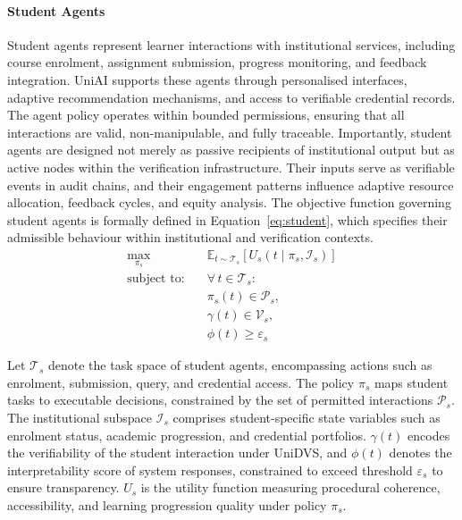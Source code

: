 \documentclass[oneside,10pt]{swissi}
\begin{document}
\paragraph{Student Agents}

Student agents represent learner interactions with institutional services, including course enrolment, assignment submission, progress monitoring, and feedback integration. UniAI supports these agents through personalised interfaces, adaptive recommendation mechanisms, and access to verifiable credential records. The agent policy operates within bounded permissions, ensuring that all interactions are valid, non-manipulable, and fully traceable. Importantly, student agents are designed not merely as passive recipients of institutional output but as active nodes within the verification infrastructure. Their inputs serve as verifiable events in audit chains, and their engagement patterns influence adaptive resource allocation, feedback cycles, and equity analysis. The objective function governing student agents is formally defined in Equation~\ref{eq:student}, which specifies their admissible behaviour within institutional and verification contexts.
\begin{align}
\label{eq:student}
\max_{\pi_s} \quad & \mathbb{E}_{t \sim \mathcal{T}_s} \left[ U_s(t \mid \pi_s, \mathcal{I}_s) \right] \\
\text{subject to:} \quad
& \forall\, t \in \mathcal{T}_s: \nonumber \\
& \pi_s(t) \in \mathcal{P}_s, \nonumber \\
& \gamma(t) \in \mathcal{V}_s, \nonumber \\
& \phi(t) \geq \varepsilon_s \nonumber
\end{align}

Let $\mathcal{T}_s$ denote the task space of student agents, encompassing actions such as enrolment, submission, query, and credential access. The policy $\pi_s$ maps student tasks to executable decisions, constrained by the set of permitted interactions $\mathcal{P}_s$. The institutional subspace $\mathcal{I}_s$ comprises student-specific state variables such as enrolment status, academic progression, and credential portfolios. $\gamma(t)$ encodes the verifiability of the student interaction under UniDVS, and $\phi(t)$ denotes the interpretability score of system responses, constrained to exceed threshold $\varepsilon_s$ to ensure transparency. $U_s$ is the utility function measuring procedural coherence, accessibility, and learning progression quality under policy $\pi_s$.
\end{document}
